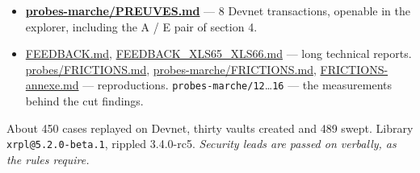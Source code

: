 \documentclass[10pt,a4paper]{article}
\newcommand{\tc}[1]{\texttt{\small #1}}
\begin{document}
\begin{itemize}
  \item \textbf{\href{./probes-marche/PREUVES.md}{probes-marche/PREUVES.md}} --- 8 Devnet transactions, openable in the explorer, including the A / E pair of section 4.
  \item \href{./FEEDBACK.md}{FEEDBACK.md}, \href{./FEEDBACK_XLS65_XLS66.md}{FEEDBACK\_XLS65\_XLS66.md} --- long technical reports. \href{./probes/FRICTIONS.md}{probes/FRICTIONS.md}, \href{./probes-marche/FRICTIONS.md}{probes-marche/FRICTIONS.md}, \href{./FRICTIONS-annexe.md}{FRICTIONS-annexe.md} --- reproductions. \tc{probes-marche/12}\ldots{}\tc{16} --- the measurements behind the cut findings.
\end{itemize}

About 450 cases replayed on Devnet, thirty vaults created and 489 swept. Library \tc{xrpl@5.2.0-beta.1}, rippled 3.4.0-rc5. \emph{Security leads are passed on verbally, as the rules require.}
\end{document}
